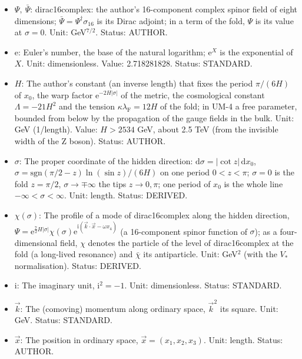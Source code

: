 \documentclass[
  10pt,
]{article}
\providecommand{\tightlist}{%
  \setlength{\itemsep}{0pt}\setlength{\parskip}{0pt}}
\begin{document}
\begin{itemize}
\tightlist
\item
  \(\Psi,\ \bar\Psi\): dirac16complex: the author's 16-component complex
  spinor field of eight dimensions;
  \(\bar\Psi = \Psi^\dagger\sigma_{16}\) is its Dirac adjoint; in a term
  of the fold, \(\Psi\) is its value at \(\sigma = 0\). Unit:
  GeV\(^{7/2}\). Status: AUTHOR.
\item
  \(\mathrm{e}\): Euler's number, the base of the natural logarithm;
  \(\mathrm{e}^{X}\) is the exponential of \(X\). Unit: dimensionless.
  Value: 2.718281828. Status: STANDARD.
\item
  \(H\): The author's constant (an inverse length) that fixes the period
  \(\pi/(6H)\) of \(x_0\), the warp factor
  \(\mathrm{e}^{-2H\lvert\sigma\rvert}\) of the metric, the cosmological
  constant \(\Lambda = -21H^2\) and the tension
  \(\kappa\lambda_{\mathrm{F}} = 12H\) of the fold; in UM-4 a free
  parameter, bounded from below by the propagation of the gauge fields
  in the bulk. Unit: GeV (1/length). Value: \(H > 2534\) GeV, about 2.5
  TeV (from the invisible width of the Z boson). Status: AUTHOR.
\item
  \(\sigma\): The proper coordinate of the hidden direction:
  \(\mathrm{d}\sigma = \lvert\cot z\rvert\,\mathrm{d}x_0\),
  \(\sigma = \mathrm{sgn}(\pi/2 - z)\ln(\sin z)/(6H)\) on one period
  \(0 < z < \pi\); \(\sigma = 0\) is the fold \(z = \pi/2\),
  \(\sigma \to \mp\infty\) the tips \(z \to 0, \pi\); one period of
  \(x_0\) is the whole line \(-\infty < \sigma < \infty\). Unit: length.
  Status: DERIVED.
\item
  \(\chi(\sigma)\): The profile of a mode of dirac16complex along the
  hidden direction,
  \(\Psi = \mathrm{e}^{\frac72H\lvert\sigma\rvert}\chi(\sigma)\mathrm{e}^{\mathrm{i}(\vec k\cdot\vec x - \omega x_4)}\)
  (a 16-component spinor function of \(\sigma\)); as a four-dimensional
  field, \(\chi\) denotes the particle of the level of dirac16complex at
  the fold (a long-lived resonance) and \(\bar\chi\) its antiparticle.
  Unit: GeV\(^{2}\) (with the \(V_*\) normalisation). Status: DERIVED.
\item
  \(\mathrm{i}\): The imaginary unit, \(\mathrm{i}^2 = -1\). Unit:
  dimensionless. Status: STANDARD.
\item
  \(\vec k\): The (comoving) momentum along ordinary space, \(\vec k^2\)
  its square. Unit: GeV. Status: STANDARD.
\item
  \(\vec x\): The position in ordinary space,
  \(\vec x = (x_1, x_2, x_3)\). Unit: length. Status: AUTHOR.

\end{itemize}
\end{document}
